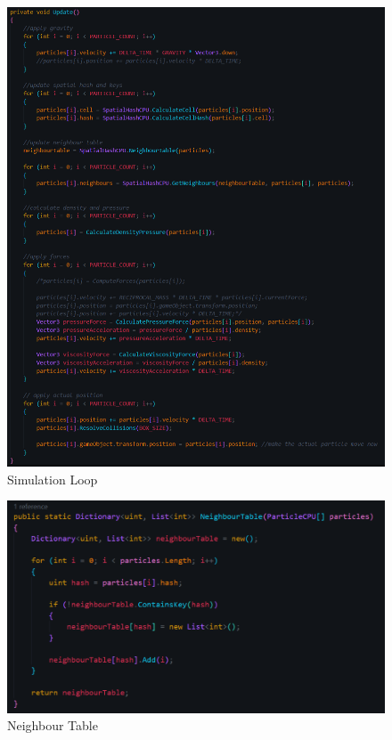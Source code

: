 \documentclass[12pt]{article}
\begin{document}
    \begin{figure}[H]
        \centering
        \includegraphics[width=\textwidth]{simulationLoopCPU.png}
        \caption{Simulation Loop}
    \end{figure}

    \begin{figure}[H]
        \centering
        \includegraphics[width=\textwidth]{neighbourTableCPU.png}
        \caption{Neighbour Table}
    \end{figure}
\end{document}
